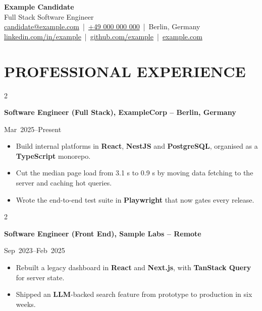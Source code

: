 \documentclass[10pt, a4paper]{article}
\newenvironment{highlights}{
    \par\nopagebreak
    \begin{minipage}{\textwidth}
    \begin{itemize}[topsep=0.10 cm,parsep=0.10 cm,partopsep=0pt,itemsep=0pt,leftmargin=10pt]
}{
    \end{itemize}
    \end{minipage}\par
}
\newenvironment{twocolentry}[1]{%
  \def\secondColumn{#1}%
  \par
  \setcolumnwidth{\fill,4.5cm}%
  \begin{paracol}{2}%
    \raggedright
}{%
    \switchcolumn
    \raggedleft\strut\secondColumn\par
  \end{paracol}\par\nopagebreak
}
\newenvironment{header}{
    \setlength{\topsep}{0pt}\par\kern\topsep\centering\linespread{1.5}
}{
    \par\kern\topsep
}
\begin{document}
\begin{header}
    {\fontsize{25pt}{25pt}\selectfont \textbf{Example Candidate}}\\[6pt]
    \normalsize
    Full Stack Software Engineer \\[6pt]
    \href{mailto:candidate@example.com}{candidate@example.com}
    \,|\,
    \href{tel:+490000000000}{+49 000 000 000}
    \,|\,
    Berlin, Germany
    \\[3pt]
    \href{https://www.linkedin.com/in/example}{linkedin.com/in/example}
    \,|\,
    \href{https://github.com/example}{github.com/example}
    \,|\,
    \href{https://example.com}{example.com}
\end{header}

\vspace{0.3cm}

\section{PROFESSIONAL EXPERIENCE}

\begin{twocolentry}{Mar~2025--Present}
\textbf{Software Engineer (Full Stack), ExampleCorp -- Berlin, Germany}
\end{twocolentry}
\begin{highlights}
\item Build internal platforms in \textbf{React}, \textbf{NestJS} and \textbf{PostgreSQL}, organised as a \textbf{TypeScript} monorepo.
\item Cut the median page load from 3.1 s to 0.9 s by moving data fetching to the server and caching hot queries.
\item Wrote the end-to-end test suite in \textbf{Playwright} that now gates every release.
\end{highlights}

\vspace{0.2cm}

\begin{twocolentry}{Sep~2023--Feb~2025}
\textbf{Software Engineer (Front End), Sample Labs -- Remote}
\end{twocolentry}
\begin{highlights}
\item Rebuilt a legacy dashboard in \textbf{React} and \textbf{Next.js}, with \textbf{TanStack Query} for server state.
\item Shipped an \textbf{LLM}-backed search feature from prototype to production in six weeks.
\end{highlights}
\end{document}
